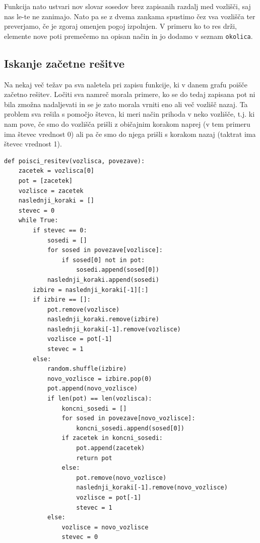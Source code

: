 \documentclass[10pt, a4paper]{article}
\begin{document}
Funkcija nato ustvari nov slovar sosedov brez zapisanih razdalj med vozlišči, saj nas le-te ne zanimajo. Nato pa se z dvema zankama spustimo čez vsa vozlišča ter preverjamo, če je zgoraj omenjen pogoj izpolnjen. V primeru ko to res drži, elemente nove poti premečemo na opisan način in jo dodamo v seznam \texttt{okolica}.




\subsection{Iskanje začetne rešitve}

Na nekaj več težav pa sva naletela pri zapisu funkcije, ki v danem grafu poišče začetno rešitev. Ločiti sva namreč morala primere, ko se do tedaj zapisana pot ni bila zmožna nadaljevati in se je zato morala vrniti eno ali več vozlišč nazaj. Ta problem sva rešila s pomočjo števca, ki meri način prihoda v neko vozlišče, t.j. ki nam pove, če smo do vozlišča prišli z običajnim korakom naprej (v tem primeru ima števec vrednost 0) ali pa če smo do njega prišli s korakom nazaj (taktrat ima števec vrednost 1).

\newpage

\begin{verbatim}
def poisci_resitev(vozlisca, povezave):
    zacetek = vozlisca[0]
    pot = [zacetek]
    vozlisce = zacetek
    naslednji_koraki = []
    stevec = 0
    while True:
        if stevec == 0:
            sosedi = []
            for sosed in povezave[vozlisce]:
                if sosed[0] not in pot:
                    sosedi.append(sosed[0])
            naslednji_koraki.append(sosedi)
        izbire = naslednji_koraki[-1][:]
        if izbire == []:
            pot.remove(vozlisce)
            naslednji_koraki.remove(izbire)
            naslednji_koraki[-1].remove(vozlisce)
            vozlisce = pot[-1]
            stevec = 1
        else:
            random.shuffle(izbire)
            novo_vozlisce = izbire.pop(0)
            pot.append(novo_vozlisce)
            if len(pot) == len(vozlisca):
                koncni_sosedi = []
                for sosed in povezave[novo_vozlisce]:
                    koncni_sosedi.append(sosed[0])
                if zacetek in koncni_sosedi:
                    pot.append(zacetek)
                    return pot
                else:
                    pot.remove(novo_vozlisce)
                    naslednji_koraki[-1].remove(novo_vozlisce)
                    vozlisce = pot[-1]
                    stevec = 1
            else:
                vozlisce = novo_vozlisce
                stevec = 0
\end{verbatim}
\end{document}
